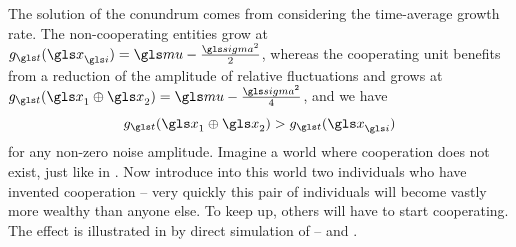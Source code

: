 The solution of the conundrum comes from considering the time-average
growth rate. The non-cooperating entities grow at $g_{\t}(\x_\gi)=\gmu-\frac{\gsigma^2}{2}$, 
whereas the cooperating unit benefits from a reduction of the amplitude of relative 
fluctuations and grows at $g_{\t}(\x_1\oplus \x_2)=\gmu-\frac{\gsigma^2}{4}$, 
and we have
\begin{equation}
g_{\t}(\x_1\oplus \x_2)>g_{\t}(\x_\gi)
\end{equation}
for any non-zero noise amplitude. Imagine a world where cooperation does not exist, 
just like in . Now introduce into this world two individuals who have 
invented cooperation -- very quickly this pair of individuals will become vastly more wealthy than
anyone else. To keep up, others will have to start cooperating. The effect is illustrated 
in  by direct simulation of
-- and .

